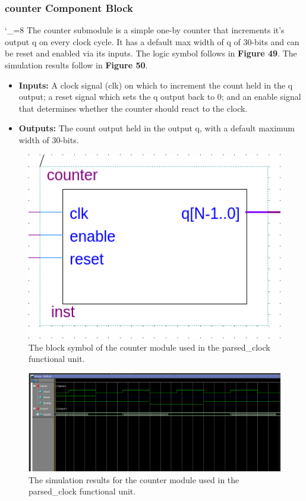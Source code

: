 \documentclass[a4paper]{article}
\begin{document}
\subsubsection{counter Component Block}
\catcode`_=8
The counter submodule is a simple one-by counter that increments it's output q on every clock cycle. It has a default max width of q of 30-bits and can be reset and enabled via its inputs. The logic symbol follows in \textbf{Figure 49}.  The simulation results follow in \textbf{Figure 50}.
\begin{itemize}
\item \textbf{Inputs:  } A clock signal (clk) on which to increment the count held in the q output; a reset signal which sets the q output back to 0; and an enable signal that determines whether the counter should react to the clock.
\item \textbf{Outputs: } The count output held in the output q, with a default maximum width of 30-bits.
\end{itemize}
\begin{figure}[h]
\centering
\includegraphics[width=.48\textwidth]{functional_units/parsed_clock/individual_blocks/counter_symbol.png}
\caption{The block symbol of the counter module used in the parsed\_clock functional unit.}
\end{figure}
\begin{figure}[h]
\centering
\includegraphics[width=.98\textwidth]{functional_units/parsed_clock/individual_blocks/counter_sim.png}
\caption{The simulation results for the counter module used in the parsed\_clock functional unit.}
\end{figure}
\clearpage
\end{document}
